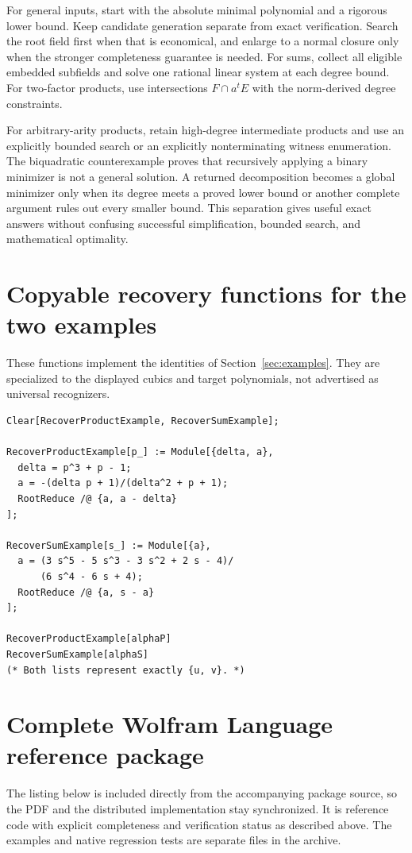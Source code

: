 \documentclass[11pt,a4paper]{article}
\theoremstyle{definition}\newtheorem{definition}[theorem]{Definition}
\theoremstyle{remark}\newtheorem{remark}[theorem]{Remark}
\begin{document}
For general inputs, start with the absolute minimal polynomial and a rigorous lower bound. Keep candidate generation separate from exact verification. Search the root field first when that is economical, and enlarge to a normal closure only when the stronger completeness guarantee is needed. For sums, collect all eligible embedded subfields and solve one rational linear system at each degree bound. For two-factor products, use intersections $F\cap a^tE$ with the norm-derived degree constraints.

For arbitrary-arity products, retain high-degree intermediate products and use an explicitly bounded search or an explicitly nonterminating witness enumeration. The biquadratic counterexample proves that recursively applying a binary minimizer is not a general solution. A returned decomposition becomes a global minimizer only when its degree meets a proved lower bound or another complete argument rules out every smaller bound. This separation gives useful exact answers without confusing successful simplification, bounded search, and mathematical optimality.

\appendix
{}
\section{Copyable recovery functions for the two examples}
\label{app:recovery}
These functions implement the identities of Section~\ref{sec:examples}. They are specialized to the displayed cubics and target polynomials, not advertised as universal recognizers.
\begin{lstlisting}
Clear[RecoverProductExample, RecoverSumExample];

RecoverProductExample[p_] := Module[{delta, a},
  delta = p^3 + p - 1;
  a = -(delta p + 1)/(delta^2 + p + 1);
  RootReduce /@ {a, a - delta}
];

RecoverSumExample[s_] := Module[{a},
  a = (3 s^5 - 5 s^3 - 3 s^2 + 2 s - 4)/
      (6 s^4 - 6 s + 4);
  RootReduce /@ {a, s - a}
];

RecoverProductExample[alphaP]
RecoverSumExample[alphaS]
(* Both lists represent exactly {u, v}. *)
\end{lstlisting}

\section{Complete Wolfram Language reference package}
\label{app:package}
The listing below is included directly from the accompanying package source, so the PDF and the distributed implementation stay synchronized. It is reference code with explicit completeness and verification status as described above. The examples and native regression tests are separate files in the archive.

\end{document}
